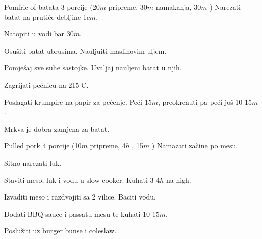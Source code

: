\documentclass[a4paper]{article}
\begin{document}
\begin{recipe}{Pomfrie of batata}%
  {3 porcije}%
  { (20$m$ pripreme, 30$m$ namakanja, 30$m$ \oven ) \textleaf}
  Narezati batat na prutiće debljine 1$cm$.

  Natopiti u vodi bar 30$m$.

  Osušiti batat ubrusima. Nauljuiti maslinovim uljem.

  Pomješaj sve suhe sastojke. Uvaljaj nauljeni batat u njih.

\ingredient[]{}{\oven}
  Zagrijati pećnicu na 215\0 C.

  Poslagati krumpire na papir za pečenje. Peći 15$m$, preokrenuti pa peći još
  10-15$m$.

\freeform
   Mrkva je dobra zamjena za batat.

\end{recipe}

\begin{recipe}{Pulled pork}%
  {4 porcije}%
  { (10$m$ pripreme, 4$h$ \oven, 15$m$ \fryingpan )}
  Namazati začine po mesu.

  Sitno narezati luk.

\ingredient[]{}{\pot}
  Staviti meso, luk i vodu u slow cooker. Kuhati 3-4$h$ na high.

\newstep
  Izvaditi meso i razdvojiti sa 2 vilice. Baciti vodu.

  Dodati BBQ sauce i passatu mesu te kuhati 10-15$m$.

  Poslužiti uz burger bunse i coleslaw.
\end{recipe}
\end{document}
